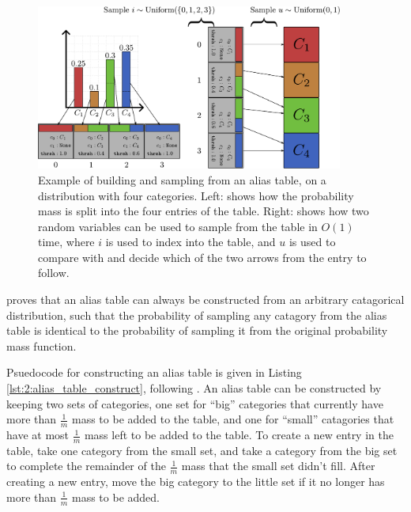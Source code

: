         
    \begin{figure}
        \centering\includegraphics[width=0.9\textwidth]{figures/ch2/alias_table.pdf} 
        \caption[Example of building and sampling from an alias table.]{Example of building and sampling from an alias table, on a distribution with four categories. Left: shows how the probability mass is split into the four entries of the table. Right: shows how two random variables can be used to sample from the table in $O(1)$ time, where $i$ is used to index into the table, and $u$ is used to compare with \thresh\ewe and decide which of the two arrows from the entry to follow.}
        \label{fig:2:alias_table_eg} 
    \end{figure}

    \citet{alias_method_two} proves that an alias table can always be constructed from an arbitrary catagorical distribution, such that the probability of sampling any catagory from the alias table is identical to the probability of sampling it from the original probability mass function. 

    Psuedocode for constructing an alias table is given in Listing \ref{lst:2:alias_table_construct}, following \cite{alias_method_one,alias_method_two}. An alias table can be constructed by keeping two sets of categories, one set for ``big'' categories that currently have more than $\frac{1}{m}$ mass to be added to the table, and one for ``small'' catagories that have at most $\frac{1}{m}$ mass left to be added to the table. To create a new entry in the table, take one category from the small set, and take a category from the big set to complete the remainder of the $\frac{1}{m}$ mass that the small set didn't fill. After creating a new entry, move the big category to the little set if it no longer has more than $\frac{1}{m}$ mass to be added. 

